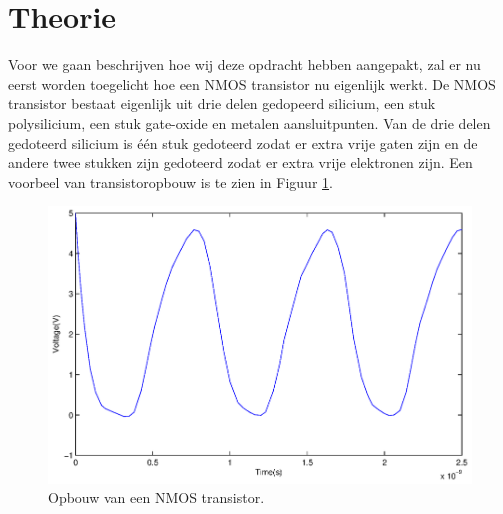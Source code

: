 \documentclass{scrartcl}  %
\begin{document}
\section{Theorie}
Voor we gaan beschrijven hoe wij deze opdracht hebben aangepakt, zal er nu eerst worden toegelicht hoe een NMOS transistor nu eigenlijk werkt. 
De NMOS transistor bestaat eigenlijk uit drie delen gedopeerd silicium, een stuk polysilicium, een stuk gate-oxide en metalen aansluitpunten. 
Van de drie delen gedoteerd silicium is één stuk gedoteerd zodat er extra vrije gaten zijn en de andere twee stukken zijn gedoteerd zodat er extra vrije elektronen zijn. 
Een voorbeel van transistoropbouw is te zien in Figuur \ref{fig:NMOS-transistor}.
\begin{figure}[H]
\centering
	\includegraphics[width=\textwidth]{images/3-inverter-oscillator}
	\caption{Opbouw van een NMOS transistor.\cite{patel-slides}}
	\label{fig:NMOS-transistor}
\end{figure}
\end{document}
